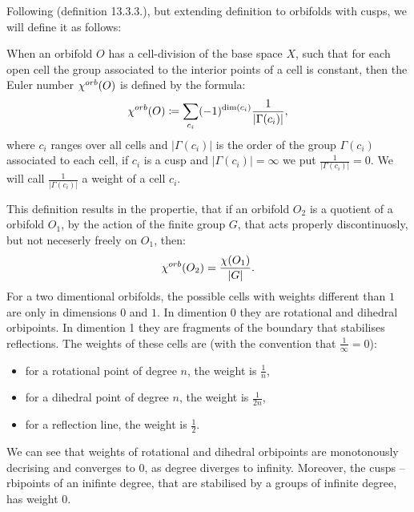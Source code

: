 
Following \cite{Thurston1979} (definition 13.3.3.), but extending 
definition to orbifolds with cusps, we will define it as follows:
\begin{definition}
When an orbifold $O$ has a cell-division of the base space $X$, such that for each
open cell the group associated to
the interior points of a cell is constant, then the Euler number ${\chi^{orb}(O)}$ is defined by
the formula:
\begin{equation}
{\chi^{orb}(O)} \coloneqq \sum_{c_i} (-1)^{ \mathrm{dim}(c_i)}\frac{1}{|\Gamma(c_i)|},
\end{equation}
where $c_i$ ranges over all cells and $|\Gamma(c_i)|$ is the order of the group $\Gamma(c_i)$ 
associated to each cell, if $c_i$ is a cusp and $|\Gamma(c_i)| = \infty$ we put 
$\frac{1}{|\Gamma(c_i)|} = 0$. We will call $\frac{1}{|\Gamma(c_i)|}$ a weight of a cell $c_i$.
\end{definition} 

This definition results in the propertie, that if an orbifold $O_2$ is a quotient 
of a orbifold $O_1$, by the action of the finite group $G$, that acts properly 
discontinuosly, but not neceserly freely on $O_1$, then:
\begin{equation}
{\chi^{orb}(O_2)} = \frac{\chi(O_1)}{|G|}.
\end{equation}
For a two dimentional orbifolds, the possible cells with weights different than $1$ are 
only in dimensions $0$ and $1$. In dimention 0 they are rotational and dihedral 
orbipoints. In dimention 1 they are fragments of the boundary that stabilises reflections. 
The weights of these cells are (with the convention that $\frac{1}{\infty} = 0$):
\begin{itemize}
\item for a rotational point of degree $n$, the weight is $\frac{1}{n}$,
\item for a dihedral point of degree $n$, the weight is $\frac{1}{2n}$,
\item for a reflection line, the weight is $\frac{1}{2}$.
\end{itemize}
We can see that weights of rotational and dihedral orbipoints are monotonously decrising 
and converges to $0$, as degree diverges to infinity. Moreover, the 
cusps -- rbipoints of an inifinte degree, 
that are stabilised by a groups of infinite degree, has weight $0$.

